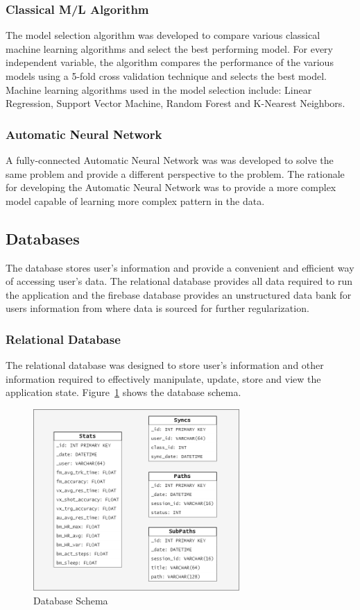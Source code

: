 \subsubsection{Classical M/L Algorithm} 
The model selection algorithm was developed to compare various classical machine learning algorithms and select the best performing model. For
every independent variable, the algorithm compares the performance of the various models using a 5-fold cross validation technique and selects
the best model. Machine learning algorithms used in the model selection include: Linear Regression, Support Vector Machine, Random Forest and 
K-Nearest Neighbors. 

\subsubsection{Automatic Neural Network}

A fully-connected Automatic Neural Network was was developed to solve the same problem and provide a different perspective to the problem. The
rationale for developing the Automatic Neural Network was to provide a more complex model capable of learning more complex pattern in the data.


\subsection{Databases}
The database stores user's information and provide a convenient and efficient way of accessing user's data. The relational database provides all
data required to run the application and the firebase database provides an unstructured data bank for users information from where data is sourced
for further regularization. 
\subsubsection{Relational Database}
The relational database was designed to store user's information and other information required to effectively manipulate, update, store and view 
the application state. Figure~\ref{image:db_schema} shows the database schema. 
\begin{figure}[h!]
    \centering
    \includegraphics[width=0.7\textwidth]{images/db_schema.png}
    \caption{Database Schema}
    \label{image:db_schema}
\end{figure}
